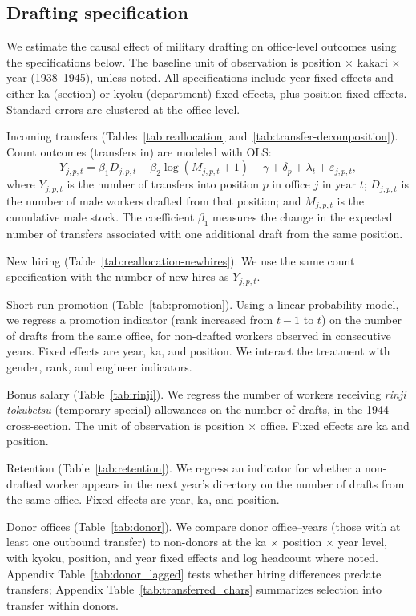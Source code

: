 \subsection{Drafting specification}

We estimate the causal effect of military drafting on office-level outcomes using the specifications below. The baseline unit of observation is position $\times$ kakari $\times$ year (1938--1945), unless noted. All specifications include year fixed effects and either ka (section) or kyoku (department) fixed effects, plus position fixed effects. Standard errors are clustered at the office level.

Incoming transfers (Tables~\ref{tab:reallocation} and~\ref{tab:transfer-decomposition}). Count outcomes (transfers in) are modeled with OLS:
\begin{equation}
Y_{j,p,t} = \beta_1 D_{j,p,t} + \beta_2 \log(M_{j,p,t}+1) + \gamma + \delta_p + \lambda_t + \varepsilon_{j,p,t},
\end{equation}
where $Y_{j,p,t}$ is the number of transfers into position $p$ in office $j$ in year $t$; $D_{j,p,t}$ is the number of male workers drafted from that position; and $M_{j,p,t}$ is the cumulative male stock. The coefficient $\beta_1$ measures the change in the expected number of transfers associated with one additional draft from the same position.

New hiring (Table~\ref{tab:reallocation-newhires}). We use the same count specification with the number of new hires as $Y_{j,p,t}$.

Short-run promotion (Table~\ref{tab:promotion}). Using a linear probability model, we regress a promotion indicator (rank increased from $t-1$ to $t$) on the number of drafts from the same office, for non-drafted workers observed in consecutive years. Fixed effects are year, ka, and position. We interact the treatment with gender, rank, and engineer indicators.

Bonus salary (Table~\ref{tab:rinji}). We regress the number of workers receiving \emph{rinji tokubetsu} (temporary special) allowances on the number of drafts, in the 1944 cross-section. The unit of observation is position $\times$ office. Fixed effects are ka and position.

Retention (Table~\ref{tab:retention}). We regress an indicator for whether a non-drafted worker appears in the next year's directory on the number of drafts from the same office. Fixed effects are year, ka, and position.

Donor offices (Table~\ref{tab:donor}). We compare donor office--years (those with at least one outbound transfer) to non-donors at the ka $\times$ position $\times$ year level, with kyoku, position, and year fixed effects and log headcount where noted. Appendix Table~\ref{tab:donor_lagged} tests whether hiring differences predate transfers; Appendix Table~\ref{tab:transferred_chars} summarizes selection into transfer within donors.

